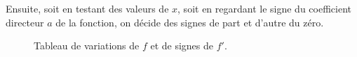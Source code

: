 {	Ensuite, soit en testant des valeurs de $x$, soit en regardant le signe du coefficient directeur $a$ de la fonction, on décide des signes de part et d'autre du zéro.
%	
%	
%	
%	
%	

}


\begin{figure}[h]
	\centering	
	\caption{Tableau de variations de $f$ et de signes de $f'$.}
	\label{fig:var-signe}
\end{figure}

